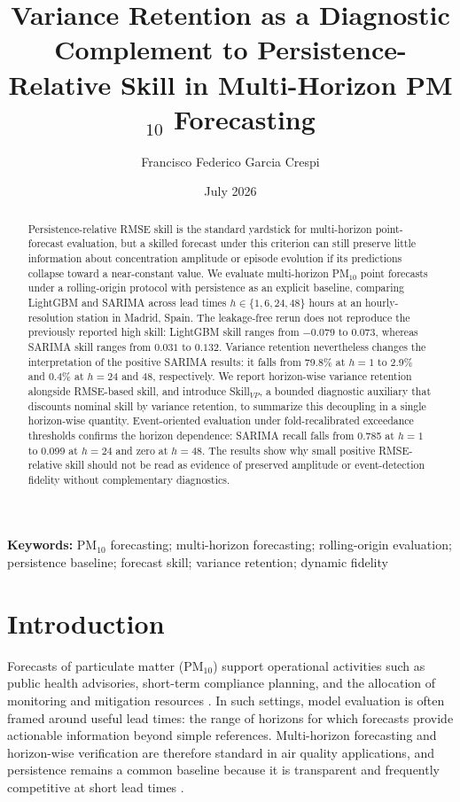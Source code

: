 \documentclass{article}
\title{Variance Retention as a Diagnostic Complement to Persistence-Relative
Skill in Multi-Horizon PM$_{10}$ Forecasting}
\author{Francisco Federico Garcia Crespi}
\date{July 2026}
\newcommand{\keywords}[1]{\par\noindent\textbf{Keywords:} #1\par}
\begin{document}
\maketitle

\begin{abstract}
Persistence-relative RMSE skill is the standard yardstick for multi-horizon
point-forecast evaluation, but a skilled forecast under this criterion can
still preserve little information about concentration amplitude or episode
evolution if its predictions collapse toward a near-constant value.
We evaluate multi-horizon PM$_{10}$ point forecasts under a rolling-origin
protocol with persistence as an explicit baseline, comparing LightGBM and
SARIMA across lead times $h \in \{1,6,24,48\}$ hours at an hourly-resolution
station in Madrid, Spain.
The leakage-free rerun does not reproduce the previously reported high skill:
LightGBM skill ranges from $-0.079$ to $0.073$, whereas SARIMA skill ranges
from $0.031$ to $0.132$.  Variance retention nevertheless changes the
interpretation of the positive SARIMA results: it falls from 79.8\% at
$h=1$ to 2.9\% and 0.4\% at $h=24$ and $48$, respectively.
We report horizon-wise variance retention alongside RMSE-based skill, and
introduce Skill$_{VP}$, a bounded diagnostic auxiliary that discounts nominal
skill by variance retention, to summarize this decoupling in a single
horizon-wise quantity.
Event-oriented evaluation under fold-recalibrated exceedance thresholds
confirms the horizon dependence: SARIMA recall falls from 0.785 at $h=1$ to
0.099 at $h=24$ and zero at $h=48$.  The results show why small positive
RMSE-relative skill should not be read as evidence of preserved amplitude or
event-detection fidelity without complementary diagnostics.
\end{abstract}

\keywords{PM$_{10}$ forecasting; multi-horizon forecasting; rolling-origin
evaluation; persistence baseline; forecast skill; variance retention;
dynamic fidelity}

\section{Introduction}

Forecasts of particulate matter (PM$_{10}$) support operational activities
such as public health advisories, short-term compliance planning, and the
allocation of monitoring and mitigation resources \citep{donnelly2015}.
In such settings, model evaluation is often framed around useful lead times:
the range of horizons for which forecasts provide actionable information beyond
simple references.
Multi-horizon forecasting and horizon-wise verification are therefore standard
in air quality applications, and persistence remains a common baseline because
it is transparent and frequently competitive at short lead times
\citep{murphy1992}.
\end{document}
